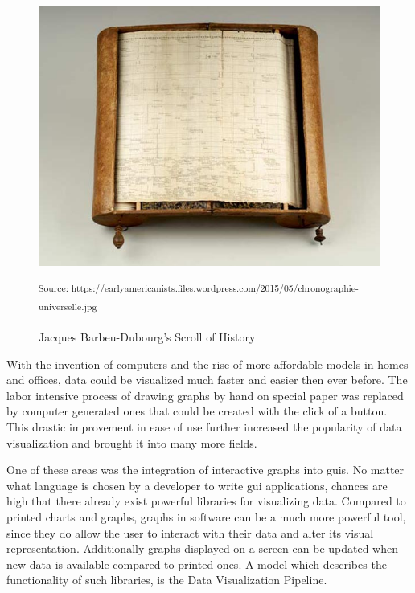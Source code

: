\begin{figure}[h]
    \centering
    \includegraphics[width=12cm]{resources/img/ScrollOfHistory}
    \caption{Jacques Barbeu-Dubourg's Scroll of History}
    \small\textsuperscript{Source: https://earlyamericanists.files.wordpress.com/2015/05/chronographie-universelle.jpg}
    \label{fig:historyscroll}
\end{figure}

With the invention of computers and the rise of more affordable models in homes
and offices, data could be visualized much faster and easier then ever before.
The labor intensive process of drawing graphs by hand on special paper was
replaced by computer generated ones that could be created with the click of a
button. This drastic improvement in ease of use further increased the popularity
of data visualization and brought it into many more fields.
\cite{DataVisHistory2}

One of these areas was the integration of interactive graphs into \glspl{gui}.
No matter what language is chosen by a developer to write \gls{gui}
applications, chances are high that there already exist powerful libraries for
visualizing data. Compared to printed charts and graphs, graphs in software can
be a much more powerful tool, since they do allow the user to interact with
their data and alter its visual representation. Additionally graphs
displayed on a screen can be updated when new data is available compared to
printed ones. A model which describes the functionality of such libraries, is
the Data Visualization Pipeline.
\cite{VisIdioms}





